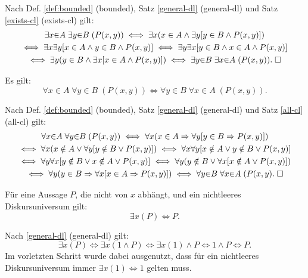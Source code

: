 \begin{Beweis} Nach Def. \ref{def:bounded} (bounded),
Satz \ref{general-dl} (general-dl)
und Satz \ref{exists-cl} (exists-cl) gilt:
\begin{gather*}
\exists x{\in}A\;\exists y{\in}B\;(P(x,y))
\iff \exists x(x\in A\land\exists y[y\in B\land P(x,y)])\\
\iff \exists x\exists y[x\in A\land y\in B\land P(x,y)]
\iff \exists y\exists x[y\in B\land x\in A\land P(x,y)]\\
\iff \exists y(y\in B\land \exists x[x\in A\land P(x,y)])
\iff \exists y{\in}B\;\exists x{\in}A\; (P(x,y)).\;\square
\end{gather*}
\end{Beweis}

\begin{Satz}\label{bounded-all-cl}
Es gilt:
\[\forall x{\in}A\;\forall y{\in}B\;(P(x,y))
\iff \forall y{\in}B\;\forall x{\in}A\;(P(x,y)).\]
\end{Satz}

\begin{Beweis}
Nach Def. \ref{def:bounded} (bounded),
Satz \ref{general-dl} (general-dl)
und Satz \ref{all-cl} (all-cl) gilt:
\begin{gather*}
\forall x{\in}A\;\forall y{\in}B\;(P(x,y))
\iff \forall x(x\in A\Rightarrow \forall y[y\in B\Rightarrow P(x,y)])\\
\iff \forall x(x\notin A\lor \forall y[y\notin B\lor P(x,y)])
\iff \forall x\forall y[x\notin A\lor y\notin B\lor P(x,y)]\\
\iff \forall y\forall x[y\notin B\lor x\notin A\lor P(x,y)]
\iff \forall y(y\notin B\lor \forall x[x\notin A\lor P(x,y)])\\
\iff \forall y(y\in B\Rightarrow \forall x[x\in A\Rightarrow P(x,y)])
\iff \forall y{\in}B\;\forall x{\in}A\;(P(x,y).\;\square
\end{gather*}
\end{Beweis}

\begin{Satz}
Für eine Aussage $P$, die nicht von $x$ abhängt, und ein nichtleeres
Diskursuniversum gilt:
\[\exists x(P) \iff P.\]
\end{Satz}
\begin{Beweis}[Beweis]
Nach \ref{general-dl} (general-dl) gilt:
\[\exists x(P) \iff \exists x(1\land P)
\iff \exists x(1)\land P\iff 1\land P\iff P.\]
Im vorletzten Schritt wurde dabei ausgenutzt, dass
für ein nichtleeres Diskursuniversum immer $\exists x(1)\iff 1$
gelten muss.\,\qedsymbol
\end{Beweis}

